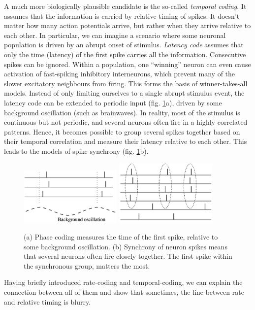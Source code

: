 \documentclass[12pt]{article}
\begin{document}
A much more biologically plausible candidate is the so-called \textit{temporal coding}.
It assumes that the information is carried by relative timing of spikes. It doesn't matter how many action potentials arrive, but rather when they arrive relative to each other. In particular, we can imagine a scenario where some neuronal population is driven by an abrupt onset of stimulus. \textit{Latency code} assumes that  only the time (latency) of the first spike carries all the information. Consecutive spikes can be ignored. Within a population, one ``winning'' neuron can even cause activation of fast-spiking inhibitory interneurons, which prevent many of the slower excitatory neighbours from firing. This forms the basis of  winner-takes-all models. Instead of only limiting ourselves to a single abrupt stimulus event, the latency code can be extended to periodic input (fig. \ref{fig:phase_coding}a), driven by some background oscillation (such as brainwaves). In reality, most of the stimulus is continuous but not periodic, and several neurons often fire in a highly correlated patterns. Hence, it becomes possible to group several spikes together based on their temporal correlation and measure their latency relative to each other. This leads to the models of spike synchrony (fig. \ref{fig:phase_coding}b).
\begin{figure}[!htbp]
	\centering
	\includegraphics[width=5cm]{phase coding}
	\includegraphics[width=5cm]{synchrony}
	\caption{(a) Phase coding measures the time of the first spike, relative to some background oscillation. (b) Synchrony of neuron spikes means that several neurons often fire closely together. The first spike within the synchronous group, matters the most.}
	\label{fig:phase_coding}
\end{figure}

Having briefly introduced rate-coding and temporal-coding, we can explain the connection between all of them and show that sometimes, the line between rate and relative timing is blurry.
\end{document}
